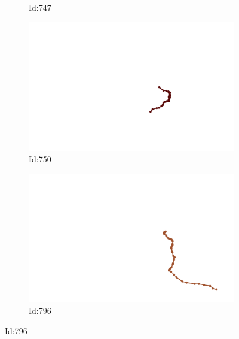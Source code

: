 \documentclass[12pt,twoside]{report}
\begin{document}
\begin{figure}
\begin{subfigure}[b]{0.20\textwidth}
\caption{Id:747}
\end{subfigure}
\begin{subfigure}[b]{0.20\textwidth}
\centering
\includegraphics[width=\textwidth]{../trajectories/750.png}
\caption{Id:750}
\end{subfigure}
\begin{subfigure}[b]{0.20\textwidth}
\centering
\includegraphics[width=\textwidth]{../trajectories/796.png}
\caption{Id:796}
\end{subfigure}
\end{figure}
\end{document}
